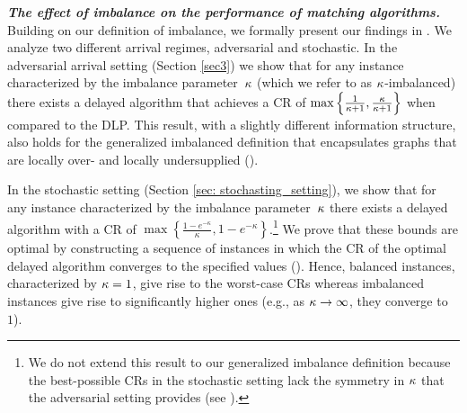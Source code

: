 \emph{\textbf{The effect of imbalance on the performance of matching algorithms.}} Building on our definition of imbalance, we formally present our findings in .  
We analyze two different arrival regimes, adversarial and stochastic. In the adversarial arrival setting (Section \ref{sec3}) we show that for any instance characterized by the imbalance parameter~$\kappa$ (which we refer to as $\kappa$-imbalanced) there exists a delayed algorithm that achieves a CR of $\max \left\{ \frac{1}{\kappa+1}, \frac{\kappa}{\kappa+1}\right\}$ when compared to the DLP. This result, with a slightly different information structure, also holds for the generalized imbalanced definition that encapsulates graphs that are locally over- and locally undersupplied ().  

In the stochastic setting (Section \ref{sec: stochasting_setting}), we show that for any instance characterized by the imbalance parameter~$\kappa$ there exists a delayed algorithm with a CR of $\max \left\{\frac{1-e^{-\kappa}}{\kappa}, 1-e^{-\kappa} \right\}$.\footnote{We do not extend this result to our generalized imbalance definition because the best-possible CRs in the stochastic setting lack the symmetry in $\kappa$ that the adversarial setting provides (see ).}
We prove that these bounds are optimal by constructing a sequence of instances in which the CR of the optimal delayed algorithm converges to the specified values (). Hence, balanced instances, characterized by $\kappa = 1$, give rise to the worst-case CRs whereas imbalanced instances give rise to significantly higher ones (e.g., as $\kappa\to\infty$, they converge to~$1$). 

